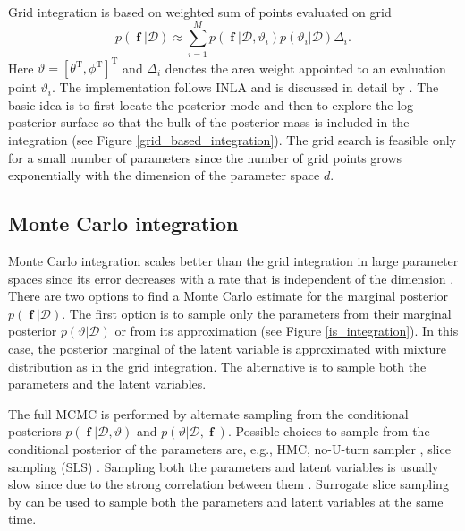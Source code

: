 \documentclass[twoside,11pt]{article}
\DeclareMathOperator{\f}{\mathbf{f}}
\begin{document}
Grid integration is based on weighted sum of points evaluated on
grid
%
\begin{equation}\label{eq_grid_integration}
p(\f|\mathcal{D}) \approx \sum_{i=1}^M p(\f|\mathcal{D}, \vartheta_i)
p(\vartheta_i|\mathcal{D}) \Delta_i.
\end{equation}
%
Here $\vartheta = [\theta^{\text{T}}, \phi^{\text{T}}]^{\text{T}}$ and
$\Delta_i$ denotes the area weight appointed to an evaluation point
$\vartheta_i$. The implementation follows INLA
\citep{Rue+Martino+Chopin:2009} and is discussed in detail by
\citet{Vanhatalo+Pietilainen+Vehtari:2010}. The basic idea is to first
locate the posterior mode and then to explore the log posterior
surface so that the bulk of the posterior mass is included in the
integration (see Figure \ref{grid_based_integration}).
The grid search is feasible only for a small number of parameters
since the number of grid points grows exponentially with the dimension
of the parameter space $d$. 

\subsection{Monte Carlo integration}

Monte Carlo integration scales better than the grid integration in
large parameter spaces since its error decreases with a rate that is
independent of the dimension \citep{Robert+Casella:2004}.  There are
two options to find a Monte Carlo estimate for the marginal posterior
$p(\f|\mathcal{D})$. The first option is to sample only the parameters
from their marginal posterior $p(\vartheta|\mathcal{D})$ or from its
approximation (see Figure \ref{is_integration}). In this case, the
posterior marginal of the latent variable is approximated with mixture
distribution as in the grid integration. The alternative is to sample
both the parameters and the latent variables.

The full MCMC is performed by alternate sampling from the conditional
posteriors $p(\f|\mathcal{D},\vartheta)$ and
$p(\vartheta|\mathcal{D},\f)$. Possible choices to sample from the
conditional posterior of the parameters are, e.g., HMC, no-U-turn sampler \citep{Hoffman+Gelman:2014}, slice
sampling (SLS) \citep{Neal:2003,Thompson+Neal:2010}. Sampling both the parameters and
latent variables is usually slow since due to the strong correlation
between them
\citep{Vanhatalo+Vehtari:2007,Vanhatalo+Pietilainen+Vehtari:2010}.
Surrogate slice sampling by \citet{Murray+Adams:2010} can be used to
sample both the parameters and latent variables at the same time.
\end{document}
